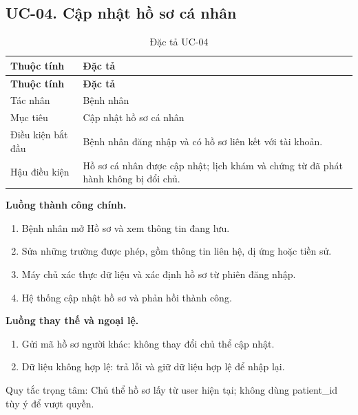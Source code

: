 \clearpage

\subsection{UC-04.\allowbreak{} Cập nhật hồ sơ cá nhân}
\label{uc:4}

{\small\setlength{\tabcolsep}{3pt}\renewcommand{\arraystretch}{1.12}
\begin{longtable}{@{}L{\textwidth-1.32pt\relax} L{\textwidth-4.68pt\relax}@{}}
\caption{Đặc tả UC-04}\\
\toprule
\textbf{Thuộc tính} & \textbf{Đặc tả}\\\midrule
\endfirsthead
\toprule
\textbf{Thuộc tính} & \textbf{Đặc tả}\\\midrule
\endhead
\bottomrule\endlastfoot
Tác nhân & Bệnh nhân\\[3pt]
Mục tiêu & Cập nhật hồ sơ cá nhân\\[3pt]
Điều kiện bắt đầu & Bệnh nhân đăng nhập và có hồ sơ liên kết với tài khoản.\allowbreak{}\\[3pt]
Hậu điều kiện & Hồ sơ cá nhân được cập nhật; lịch khám và chứng từ đã phát hành không bị đổi chủ.\allowbreak{}\\[3pt]
\end{longtable}}
\noindent\textbf{Luồng thành công chính.}
\begin{enumerate}
\item Bệnh nhân mở Hồ sơ và xem thông tin đang lưu.\allowbreak{}
\item Sửa những trường được phép, gồm thông tin liên hệ, dị ứng hoặc tiền sử.\allowbreak{}
\item Máy chủ xác thực dữ liệu và xác định hồ sơ từ phiên đăng nhập.\allowbreak{}
\item Hệ thống cập nhật hồ sơ và phản hồi thành công.\allowbreak{}
\end{enumerate}
\noindent\textbf{Luồng thay thế và ngoại lệ.}
\begin{enumerate}
\item Gửi mã hồ sơ người khác:\allowbreak{} không thay đổi chủ thể cập nhật.\allowbreak{}
\item Dữ liệu không hợp lệ:\allowbreak{} trả lỗi và giữ dữ liệu hợp lệ để nhập lại.\allowbreak{}
\end{enumerate}
Quy tắc trọng tâm:\allowbreak{} Chủ thể hồ sơ lấy từ user hiện tại; không dùng patient\_\allowbreak{}id tùy ý để vượt quyền.\allowbreak{}

\clearpage

